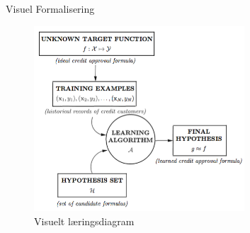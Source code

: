 \documentclass[12pt,t]{beamer}
\begin{document}
    \begin{frame}[c]{Visuel Formalisering}
            \begin{figure}[h!]
                \caption{Visuelt læringsdiagram}
                \centering
                \includegraphics[width=0.7\textwidth]{include/dia.png}
            \end{figure}
    \end{frame}
\end{document}
